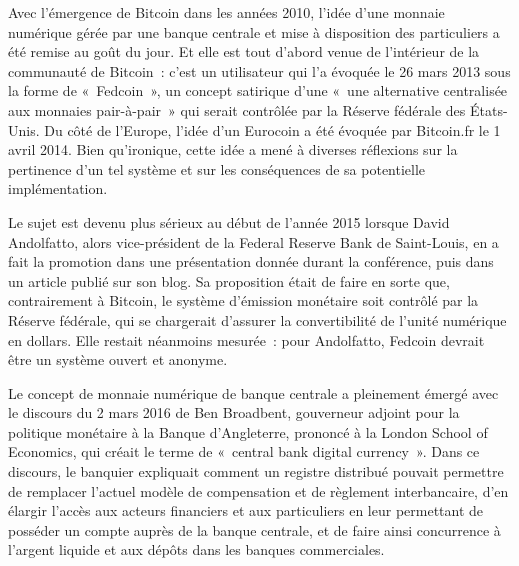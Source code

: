 Avec l'émergence de Bitcoin dans les années 2010, l'idée d'une monnaie numérique gérée par une banque centrale et mise à disposition des particuliers a été remise au goût du jour. Et elle est tout d'abord venue de l'intérieur de la communauté de Bitcoin~: c'est un utilisateur qui l'a évoquée le 26 mars 2013 sous la forme de «~Fedcoin~», un concept satirique d'une «~une alternative centralisée aux monnaies pair-à-pair~» qui serait contrôlée par la Réserve fédérale des États-Unis. Du côté de l'Europe, l'idée d'un Eurocoin a été évoquée par Bitcoin.fr le 1\ier{} avril 2014. Bien qu'ironique, cette idée a mené à diverses réflexions sur la pertinence d'un tel système et sur les conséquences de sa potentielle implémentation.

Le sujet est devenu plus sérieux au début de l'année 2015 lorsque David Andolfatto, alors vice-président de la Federal Reserve Bank de Saint-Louis, en a fait la promotion dans une présentation donnée durant la conférence, puis dans un article publié sur son blog. Sa proposition était de faire en sorte que, contrairement à Bitcoin, le système d'émission monétaire soit contrôlé par la Réserve fédérale, qui se chargerait d'assurer la convertibilité de l'unité numérique en dollars. Elle restait néanmoins mesurée~: pour Andolfatto, Fedcoin devrait être un système ouvert et anonyme.

Le concept de monnaie numérique de banque centrale a pleinement émergé avec le discours du 2 mars 2016 de Ben Broadbent, gouverneur adjoint pour la politique monétaire à la Banque d'Angleterre, prononcé à la London School of Economics, qui créait le terme de «~central bank digital currency~». Dans ce discours, le banquier expliquait comment un registre distribué pouvait permettre de remplacer l'actuel modèle de compensation et de règlement interbancaire, d'en élargir l'accès aux acteurs financiers et aux particuliers en leur permettant de posséder un compte auprès de la banque centrale, et de faire ainsi concurrence à l'argent liquide et aux dépôts dans les banques commerciales.

